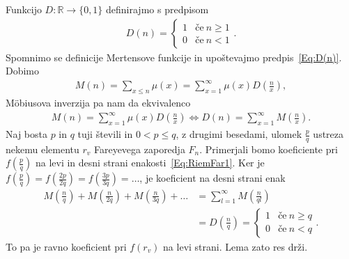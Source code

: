 \documentclass[mat1]{fmfdelo}
\begin{document}
\begin{dokaz}
Funkcijo $D: \mathbb{R} \to \{0,1\}$ definirajmo s predpisom
\begin{align}
\label{Eq:D(n)}
D(n) = \left\{
\begin{array}{rl}
	1 & \textrm{če}\ n \geq 1 \\
	0 & \textrm{če}\ n < 1
\end{array}.
\right.
\end{align}
Spomnimo se definicije Mertensove funkcije in upoštevajmo predpis~\eqref{Eq:D(n)}. Dobimo
\begin{align*}
M(n) = \sum_{x \leq n} \mu(x) = \sum_{x=1}^{\infty} \mu(x) D \left( \frac{n}{x} \right),
\end{align*}
M\"obiusova inverzija pa nam da ekvivalenco
\begin{align*}
M(n) = \sum_{x=1}^{\infty} \mu(x) D \left( \frac{n}{x} \right) \Longleftrightarrow
D(n) = \sum_{x=1}^{\infty} M \left( \frac{n}{x} \right).
\end{align*}
Naj bosta $p$ in $q$ tuji števili in $0 < p \leq q$, z drugimi besedami, ulomek $\frac{p}{q}$ ustreza nekemu elementu $r_{v}$ Fareyevega zaporedja $F_{n}$.
Primerjali bomo koeficiente pri $f(\frac{p}{q})$ na levi in desni strani enakosti~\eqref{Eq:RiemFar1}.
Ker je $ f(\frac{p}{q}) = f(\frac{2p}{2q}) = f(\frac{3p}{3q}) = \dots $, je koeficient na desni strani enak 
%
\begin{align*}
M \left(\frac{n}{q} \right) + M \left(\frac{n}{2q} \right) + M \left(\frac{n}{3q} \right) + \dots &= \sum_{l=1}^{\infty} M \left(\frac{n}{ql} \right) \\
&= D \left(\frac{n}{q} \right) = \left\{
\begin{array}{rl}
	1 & \textrm{če}\ n \geq q \\
	0 & \textrm{če}\ n < q
\end{array}.
\right.
\end{align*}
%
To pa je ravno koeficient pri $f(r_{v})$ na levi strani. Lema zato res drži.
%
\end{dokaz}

\end{document}
